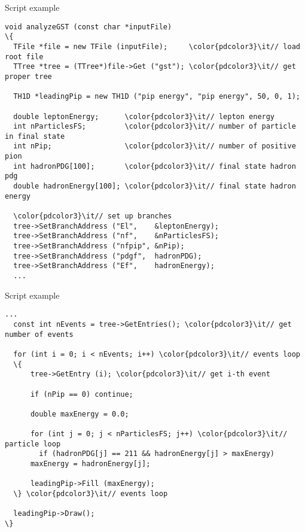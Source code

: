 \begin{wideslide}[method=direct]{Script example}
\null\vfill
 
\begin{Verbatim}[commandchars=\\\{\}] 
void analyzeGST (const char *inputFile)
\{
  TFile *file = new TFile (inputFile);     \color{pdcolor3}\it// load root file
  TTree *tree = (TTree*)file->Get ("gst"); \color{pdcolor3}\it// get proper tree
  
  TH1D *leadingPip = new TH1D ("pip energy", "pip energy", 50, 0, 1);
  
  double leptonEnergy;      \color{pdcolor3}\it// lepton energy
  int nParticlesFS;         \color{pdcolor3}\it// number of particle in final state
  int nPip;                 \color{pdcolor3}\it// number of positive pion
  int hadronPDG[100];       \color{pdcolor3}\it// final state hadron pdg
  double hadronEnergy[100]; \color{pdcolor3}\it// final state hadron energy
  
  \color{pdcolor3}\it// set up branches
  tree->SetBranchAddress ("El",    &leptonEnergy);
  tree->SetBranchAddress ("nf",    &nParticlesFS);
  tree->SetBranchAddress ("nfpip", &nPip);
  tree->SetBranchAddress ("pdgf",  hadronPDG);
  tree->SetBranchAddress ("Ef",    hadronEnergy);  
  ...
\end{Verbatim}
 
\vfill\null
\end{wideslide}

\begin{wideslide}[method=direct, toc=]{Script example}
\null\vfill
 
\begin{Verbatim}[commandchars=\\\{\}]   
  ...
  const int nEvents = tree->GetEntries(); \color{pdcolor3}\it// get number of events

  for (int i = 0; i < nEvents; i++) \color{pdcolor3}\it// events loop
  \{
      tree->GetEntry (i); \color{pdcolor3}\it// get i-th event
      
      if (nPip == 0) continue;
      
      double maxEnergy = 0.0;
            
      for (int j = 0; j < nParticlesFS; j++) \color{pdcolor3}\it// particle loop
        if (hadronPDG[j] == 211 && hadronEnergy[j] > maxEnergy)
	  maxEnergy = hadronEnergy[j];        
            
      leadingPip->Fill (maxEnergy);
  \} \color{pdcolor3}\it// events loop
  
  leadingPip->Draw();
\}
\end{Verbatim}
 
\vfill\null
\end{wideslide}

